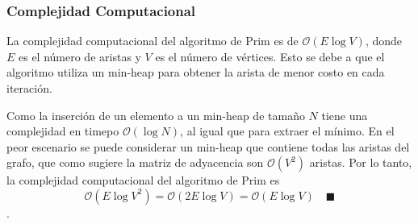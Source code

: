 \documentclass[12pt]{article}
\begin{document}
    \subsubsection{Complejidad Computacional}
    La complejidad computacional del algoritmo de Prim es de $\mathcal{O}(E\log V)$, donde $E$ es el número de aristas
    y $V$ es el número de vértices. Esto se debe a que el algoritmo utiliza un min-heap para obtener la arista
    de menor costo en cada iteración. 
    
    Como la inserción de un elemento a un min-heap de tamaño $N$ tiene una complejidad en timepo $\mathcal{O}(\log N)$, al igual que para extraer el mínimo. 
    En el peor escenario se puede considerar un min-heap que contiene todas las aristas del grafo, que como sugiere la matriz de adyacencia
    son $\mathcal{O}(V^2)$ aristas. Por lo tanto, la complejidad computacional del algoritmo de Prim es 
    $$\mathcal{O}(E\log V^{2}) = \mathcal{O}(2E\log V) = \mathcal{O}(E\log V) \quad \blacksquare$$.
\end{document}
